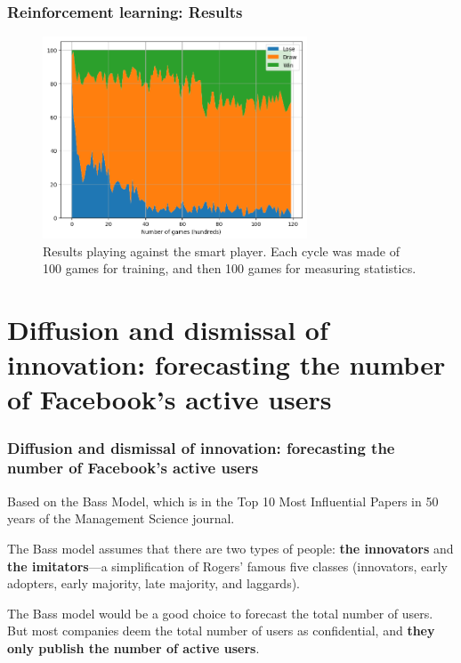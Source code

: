 \documentclass{beamer}
\begin{document}
\begin{frame}
\frametitle{Reinforcement learning: Results}
\begin{figure}
\includegraphics[width=0.7\textwidth]{./images02/ttt/results-smart.png}
\caption{Results playing against the smart player. Each cycle was made of 100 games for training, and then 100 games for measuring statistics.
\label{fig:ttt-results-smart}
}
\end{figure}
\end{frame}




\section{Diffusion and dismissal of innovation: forecasting the number of Facebook’s active users}
\begin{frame}
\sectionpage
\end{frame}


\begin{frame}
\frametitle{Diffusion and dismissal of innovation: forecasting the number of Facebook’s active users}

Based on the Bass Model, which is in the Top 10 Most Influential Papers in 50 years of the Management Science journal.

The Bass model assumes that there are two types of people: \textbf{the innovators} and \textbf{the imitators}---a simplification of Rogers' famous five classes (innovators, early adopters, early majority, late majority, and laggards).

The Bass model would be a good choice to forecast the total number of users. But most companies deem the total number of users as confidential, and \textbf{they only publish the number of active users}.

\end{frame}
\end{document}
